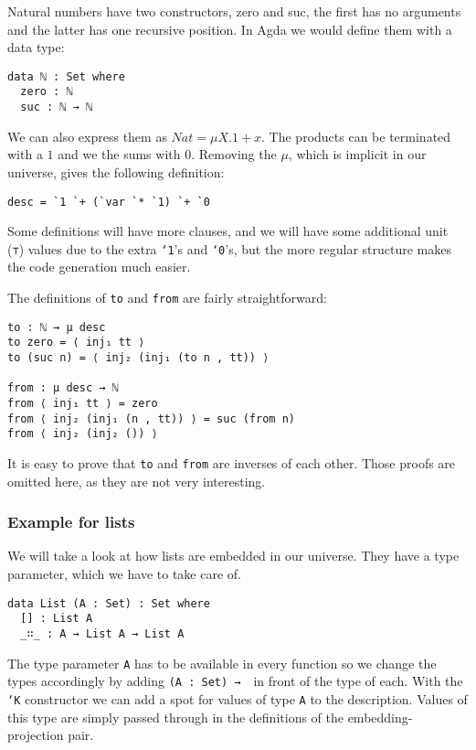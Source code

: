 Natural numbers have two constructors, zero and suc, the first has no
arguments and the latter has one recursive position.
In Agda we would define them with a data type:

\begin{verbatim}
data ℕ : Set where
  zero : ℕ
  suc : ℕ → ℕ
\end{verbatim}

We can also express them as $Nat = μX. 1 + x$.
The products can be terminated with a $1$ and we the sums with $0$.
Removing the $μ$, which is implicit in our universe, gives the
following definition:

\begin{verbatim}
desc = `1 `+ (`var `* `1) `+ `0
\end{verbatim}

Some definitions will have more clauses, and we will have some
additional unit (\texttt{⊤}) values due to the extra \texttt{`1}'s and
\texttt{`0}'s, but the more regular structure makes the code
generation much easier.

The definitions of \texttt{to} and \texttt{from} are fairly
straightforward:

\begin{verbatim}
to : ℕ → μ desc
to zero = ⟨ inj₁ tt ⟩
to (suc n) = ⟨ inj₂ (inj₁ (to n , tt)) ⟩

from : μ desc → ℕ
from ⟨ inj₁ tt ⟩ = zero
from ⟨ inj₂ (inj₁ (n , tt)) ⟩ = suc (from n)
from ⟨ inj₂ (inj₂ ()) ⟩
\end{verbatim}

It is easy to prove that \texttt{to} and \texttt{from} are inverses of
each other.
Those proofs are omitted here, as they are not very interesting.

\subsubsection{Example for lists}

We will take a look at how lists are embedded in our universe.
They have a type parameter, which we have to take care of.

\begin{verbatim}
data List (A : Set) : Set where
  [] : List A
  _∷_ : A → List A → List A
\end{verbatim}

The type parameter \texttt{A} has to be available in every function so we change
the types accordingly by adding \texttt{(A : Set) →}\ \ in front of the
type of each.
With the \texttt{`K} constructor we can add a spot for values of type \texttt{A} to
the description.
Values of this type are simply passed through in the definitions of
the embedding-projection pair.


